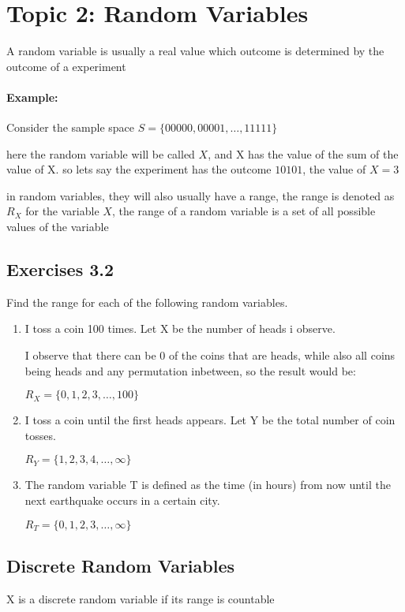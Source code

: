 \section*{Topic 2: Random Variables}
A random variable is usually a real value which outcome is determined by the outcome of a experiment

\paragraph{Example:}

Consider the sample space $S=\{00000, 00001, \ldots, 11111\}$

here the random variable will be called $X$, and X has the value of the sum of the value of X. so lets say the experiment has the outcome $10101$, the value of $X=3$

in random variables, they will also usually have a range, the range is denoted as $R_X$ for the variable $X$, the range of a random variable is a set of all possible values of the variable



\subsection*{Exercises 3.2}
Find the range for each of the following random variables.

	\begin{enumerate}
		\item I toss a coin 100 times. Let X be the number of heads i observe.
	
		I observe that there can be 0 of the coins that are heads, while also all coins being heads and any permutation inbetween, so the result would be:

		$R_X=\{0,1,2,3, \ldots, 100\}$
	
		\item I toss a coin until the first heads appears. Let Y be the total number of coin tosses.

		$R_Y=\{1,2,3,4,\ldots, \infty\}$

		\item The random variable T is defined as the time (in hours) from now until the next earthquake occurs in a certain city.

		$R_T=\{0,1,2,3, \ldots, \infty\}$
	\end{enumerate}

\subsection*{Discrete Random Variables}
X is a discrete random variable if its range is countable
